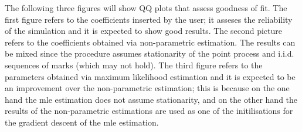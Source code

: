 \documentclass[10pt, article,table]{article}
\begin{document}
The following three figures will show QQ plots that assess goodness of
fit. The first figure refers to the coefficients inserted by the user;
it asseses the reliability of the simulation and it is expected to show
good results. The second picture refers to the coefficients obtained via
non-parametric estimation. The results can be mixed since the procedure
assumes stationarity of the point process and i.i.d. sequences of marks
(which may not hold). The third figure refers to the parameters obtained
via maximum likelihood estimation and it is expected to be an
improvement over the non-parametric estimation; this is because on the
one hand the mle estimation does not assume stationarity, and on the
other hand the results of the non-parametric estimations are used as one
of the initilisations for the gradient descent of the mle estimation.
\end{document}
